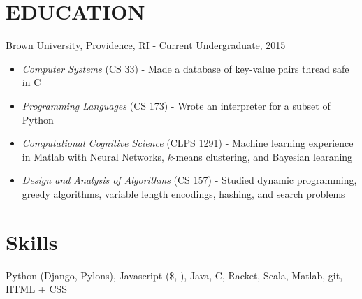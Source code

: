 \documentclass[11pt]{res} %
\begin{document}

\address{{\bf PRESENT ADDRESS} \\   69 Brown St. \\ P.O. Box 3705 \\  Providence, RI
         02912   \\ (508)-439-1871}
\address{{\bf PERMANENT ADDRESS} \\ 9 Garrison Lane \\ Southborough,
         MA 01772 \\ \href{https://github.com/csharrison}{github.com/csharrison}
\\  charles\_harrison@brown.edu}
\begin{resume}

\section{EDUCATION}
Brown University, Providence, RI - Current Undergraduate, 2015
\begin{itemize} \itemsep -2pt
  \item \emph{Computer Systems} (CS 33) - Made a database of key-value pairs thread safe in C
  \item \emph{Programming Languages} (CS 173) - Wrote an interpreter for a subset of Python
  \item \emph{Computational Cognitive Science} (CLPS 1291) - Machine learning experience in Matlab with Neural Networks, $k$-means clustering, and Bayesian learaning
  \item \emph{Design and Analysis of Algorithms} (CS 157) - Studied dynamic programming, greedy algorithms, variable length encodings, hashing,  and search problems
\end{itemize}

 \section{Skills}
  Python (Django, Pylons), Javascript (\$, \underline{\hspace{.25cm}}), Java, C, Racket, Scala, Matlab, git, HTML + CSS


\end{resume}
\end{document}
